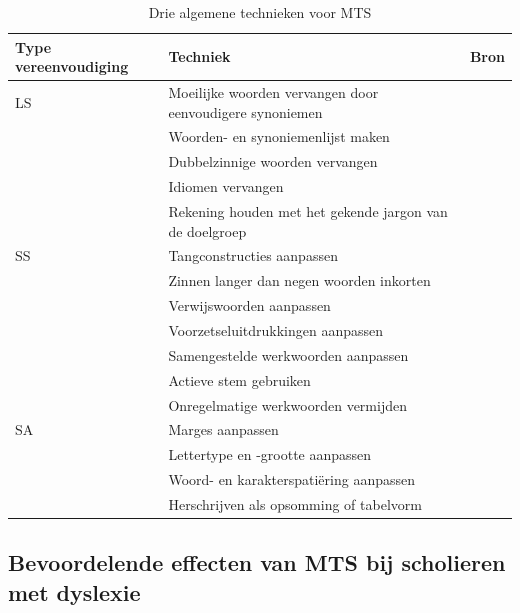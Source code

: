 \begin{center}
		\begin{table}[H]
			\begin{tabular}{ | m{1cm} | m{8cm} | m{6cm} | } 
			\hline
			\textbf{Type vereenvoudiging} & \textbf{Techniek} & \textbf{Bron} \\ \hline
			
			LS & Moeilijke woorden vervangen door eenvoudigere synoniemen & \autocite{Crossley2012, Rello2013c, Siddharthan2014} \\ 
				& Woorden- en synoniemenlijst maken & \autocite{Siddharthan2006, Bosmans2022b} \\
				& Dubbelzinnige woorden vervangen & \\
				& Idiomen vervangen & \autocite{Siddharthan2006} \\ 
				& Rekening houden met het gekende jargon van de doelgroep & \autocite{JavoureyDrevet2022} \\
			\hline
			SS & Tangconstructies aanpassen & \autocite{Bosmans2022c} \\
			& Zinnen langer dan negen woorden inkorten & \autocite{Siddharthan2014} \\
			& Verwijswoorden aanpassen & \autocite{Bosmans2022a} \\
			& Voorzetseluitdrukkingen aanpassen & \autocite{Rello2013d} \\
			& Samengestelde werkwoorden aanpassen & \autocite{Bosmans2022b} \\
			& Actieve stem gebruiken & \autocite{Ruelas2020} \\
			& Onregelmatige werkwoorden vermijden & \autocite{Rello2013d, Gala2016} \\
			\hline
			SA & Marges aanpassen & \autocite{Rello2013d} \\
			& Lettertype en -grootte aanpassen & \autocite{Rello2012a} \\
			& Woord- en karakterspatiëring aanpassen & \autocite{Rello2012a} \\
			& Herschrijven als opsomming of tabelvorm & \autocite{Rello2015} \\
			\hline
		\end{tabular}
		\caption{Drie algemene technieken voor MTS}
		\label{table:manual-simplification}
	\end{table}
\end{center}

\subsection{Bevoordelende effecten van MTS bij scholieren met dyslexie}


